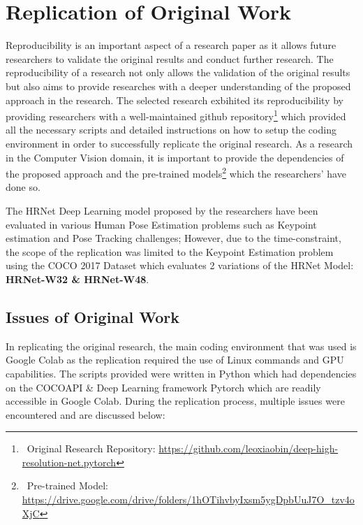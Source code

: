 \documentclass[a4paper,12pt]{article}
\begin{document}
\section{Replication of Original Work}

   Reproducibility is an important aspect of a research paper as it allows future researchers to validate the original results and conduct further research. The reproducibility of a research not only allows the validation of the original results but also aims to provide researches with a deeper understanding of the proposed approach in the research. The selected research exbihited its reproducibility by providing researchers with a well-maintained github repository\footnote{\ Original Research Repository: \url{https://github.com/leoxiaobin/deep-high-resolution-net.pytorch}} which provided all the necessary scripts and detailed instructions on how to setup the coding environment in order to successfully replicate the original research. As a research in the Computer Vision domain, it is important to provide the dependencies of the proposed approach and the pre-trained models\footnote{\ Pre-trained Model: \url{https://drive.google.com/drive/folders/1hOTihvbyIxsm5ygDpbUuJ7O_tzv4oXjC}} which the researchers' have done so.\par
   
   The HRNet Deep Learning model proposed by the researchers have been evaluated in various Human Pose Estimation problems such as Keypoint estimation and Pose Tracking challenges; However, due to the time-constraint, the scope of the replication was limited to the Keypoint Estimation problem using the COCO 2017 Dataset which evaluates 2 variations of the HRNet Model: \textbf{HRNet-W32 \& HRNet-W48}. \par
        
\subsection{Issues of Original Work}

In replicating the original research, the main coding environment that was used is Google Colab as the replication required the use of Linux commands and GPU capabilities. The scripts provided were written in Python which had dependencies on the COCOAPI \& Deep Learning framework Pytorch which are readily accessible in Google Colab. During the replication process, multiple issues were encountered and are discussed below:\par
\end{document}
